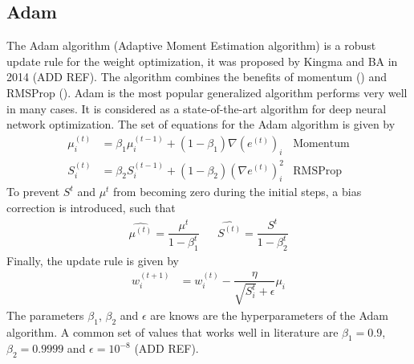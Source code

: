 \subsection*{Adam}
The Adam algorithm (Adaptive Moment Estimation algorithm) is a robust update rule for the weight optimization, it was proposed by Kingma and BA in 2014 (ADD REF). The algorithm combines the benefits of momentum () and RMSProp (). Adam is the most popular generalized algorithm performs very well in many cases. It is considered as a state-of-the-art algorithm for deep neural network optimization. The set of equations for the Adam algorithm is given by
\begin{align}
    \nonumber
    \mu^{(t)}_i &= \beta_1 {\mu}^{(t-1)}_i + (1-\beta_1)\nabla(e^{(t)})_i &\text{Momentum} \\
    \nonumber
    {S}^{(t)}_i &= \beta_2 {S}^{(t-1)}_i + (1-\beta_2)(\nabla e^{(t)})_i^2 &\text{RMSProp}    
\end{align}
To prevent $S^t$ and $\mu^t$ from becoming zero during the initial steps, a bias correction is introduced, such that
\begin{align*}
    \hat{\mu^{(t)}} = \dfrac{\mu^{t}}{1-\beta_1^t} & & \hat{S^{(t)}} = \dfrac{S^t}{1-\beta_2^t}
\end{align*}
Finally, the update rule is given by
\begin{align}
    \label{eq:Adam_def}
    {w}^{(t+1)}_i &= {w}^{(t)}_i - \dfrac{\eta}{\sqrt{S^t_i} + \epsilon}\mu_i
\end{align}
The parameters $\beta_1$, $\beta_2$ and $\epsilon$ are knows are the hyperparameters of the Adam algorithm. A common set of values that works well in literature are $\beta_1 = 0.9$, $\beta_2 = 0.9999$ and $\epsilon = 10^{-8}$ (ADD REF).
